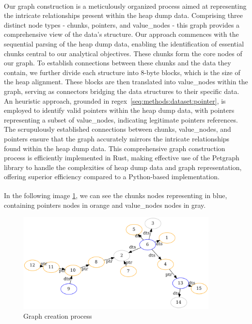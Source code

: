         \paragraph{}Our graph construction is a meticulously organized process aimed at representing the intricate relationships present within the heap dump data. Comprising three distinct node types - \glspl{chunk}, \glspl{pointer}, and \glspl{value_node} - this graph provides a comprehensive view of the data's structure. Our approach commences with the sequential parsing of the heap dump data, enabling the identification of essential \glspl{chunk} central to our analytical objectives. These \glspl{chunk} form the core nodes of our graph. To establish connections between these \glspl{chunk} and the data they contain, we further divide each structure into 8-byte blocks, which is the size of the heap alignment. These blocks are then translated into \glspl{value_node} within the graph, serving as connectors bridging the data structures to their specific data. An heuristic approach, grounded in \acrshort{regex}~\ref{seq:methods:dataset:pointer}, is employed to identify valid \glspl{pointer} within the heap dump data, with \glspl{pointer} representing a subset of \glspl{value_node}, indicating legitimate \glspl{pointer} references. The scrupulously established connections between \glspl{chunk}, \glspl{value_node}, and \glspl{pointer} ensure that the graph accurately mirrors the intricate relationships found within the heap dump data. This comprehensive graph construction process is efficiently implemented in Rust, making effective use of the Petgraph library to handle the complexities of heap dump data and graph representation, offering superior efficiency compared to a Python-based implementation.

        \paragraph{}In the following image \ref{fig:graph_embedding:graph_creation_process}, we can see the \glspl{chunk} nodes representing in blue, containing \glspl{pointer} nodes in orange and \glspl{value_node} nodes in gray. 

        \begin{figure}[H]
            \centering
            \includegraphics[width=0.9\textwidth]{img/graph_embeding/graph_explain.png}
            \caption{Graph creation process}
            \label{fig:graph_embedding:graph_creation_process}
        \end{figure}

